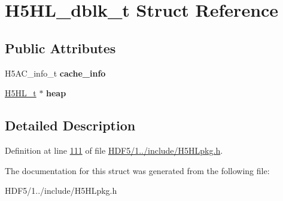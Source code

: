 \hypertarget{struct_h5_h_l__dblk__t}{}\section{H5\+H\+L\+\_\+dblk\+\_\+t Struct Reference}
\label{struct_h5_h_l__dblk__t}
\subsection*{Public Attributes}
\begin{DoxyCompactItemize}
\item 
\mbox{\label{struct_h5_h_l__dblk__t_a6043972855faa9ce8f6e37fa52b75af3}} 
H5\+A\+C\+\_\+info\+\_\+t {\bfseries cache\+\_\+info}
\item 
\mbox{\label{struct_h5_h_l__dblk__t_a89f5f7119c9cf57b19c75543bf9e3162}} 
\hyperlink{struct_h5_h_l__t}{H5\+H\+L\+\_\+t} $\ast$ {\bfseries heap}
\end{DoxyCompactItemize}


\subsection{Detailed Description}


Definition at line \hyperlink{_h_d_f5_21_810_81_2include_2_h5_h_lpkg_8h_source_l00111}{111} of file \hyperlink{_h_d_f5_21_810_81_2include_2_h5_h_lpkg_8h_source}{H\+D\+F5/1../include/\+H5\+H\+Lpkg.\+h}.



The documentation for this struct was generated from the following file\+:\begin{DoxyCompactItemize}
\item 
H\+D\+F5/1../include/\+H5\+H\+Lpkg.\+h\end{DoxyCompactItemize}
